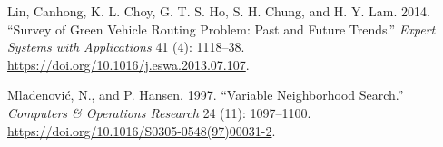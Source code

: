 \documentclass[
]{article}
\begin{document}
\leavevmode\hypertarget{ref-lin_survey_2014}{}%
Lin, Canhong, K. L. Choy, G. T. S. Ho, S. H. Chung, and H. Y. Lam. 2014.
``Survey of Green Vehicle Routing Problem: Past and Future Trends.''
\emph{Expert Systems with Applications} 41 (4): 1118--38.
\url{https://doi.org/10.1016/j.eswa.2013.07.107}.

\leavevmode\hypertarget{ref-mladenovic_variable_1997}{}%
Mladenović, N., and P. Hansen. 1997. ``Variable Neighborhood Search.''
\emph{Computers \& Operations Research} 24 (11): 1097--1100.
\url{https://doi.org/10.1016/S0305-0548(97)00031-2}.
\end{document}
